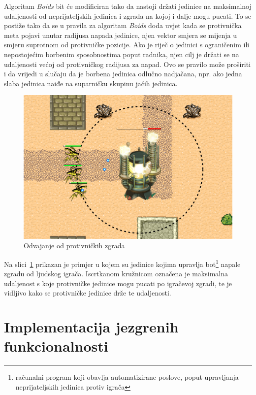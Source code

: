 \documentclass[times, utf8, zavrsni, numeric]{fer}
\begin{document}
\par Algoritam \textit{Boids} bit će modificiran tako da nastoji držati jedinice na maksimalnoj udaljenosti od neprijateljskih jedinica i zgrada na kojoj i dalje mogu pucati.
To se postiže tako da se u pravila za algoritam \textit{Boids} doda uvjet kada se protivnička meta pojavi unutar radijusa napada jedinice, njen vektor smjera se mijenja u smjeru suprotnom od protivničke pozicije.
Ako je riječ o jedinici s ograničenim ili nepostojećim borbenim sposobnostima poput radnika, njen cilj je držati se na udaljenosti većoj od protivničkog radijusa za napad.
Ovo se pravilo može proširiti i da vrijedi u slučaju da je borbena jedinica odlučno nadjačana, npr. ako jedna slaba jedinica naiđe na suparničku skupinu jačih jedinica.

\begin{figure}[h]
	\centering
	\includegraphics[width=0.8\linewidth]{images/boidsEnemySeparation.pdf}
	\caption{Odvajanje od protivničkih zgrada}
	\label{fig:boidsEnemySeparation}
\end{figure}

\par Na slici~\ref{fig:boidsEnemySeparation} prikazan je primjer u kojem su jedinice kojima upravlja bot\footnote{računalni program koji obavlja automatizirane poslove, poput upravljanja neprijateljskih jedinica protiv igrača} napale zgradu od ljudskog igrača.
Iscrtkanom kružnicom označena je maksimalna udaljenost s koje protivničke jedinice mogu pucati po igračevoj zgradi, te je vidljivo kako se protivničke jedinice drže te udaljenosti.

\chapter{Implementacija jezgrenih funkcionalnosti}\label{ch:implementation}
\end{document}
